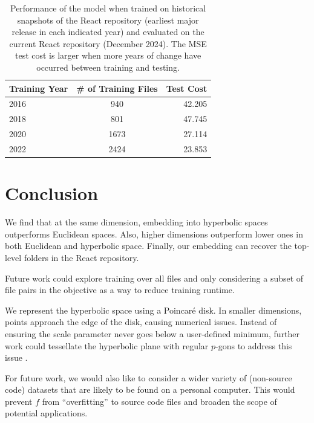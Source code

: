 \documentclass{article}
\begin{document}
\begin{table}[H]
  \centering
  \begin{tabular}{lcr}
    \toprule
    \textbf{Training Year}
         & \textbf{\# of Training Files}
         & \textbf{Test Cost}                     \\
    \midrule
    2016 & 940                           & 42.205 \\
    2018 & 801                           & 47.745 \\
    2020 & 1673                          & 27.114 \\
    2022 & 2424                          & 23.853 \\
    \bottomrule
  \end{tabular}
  \caption{Performance of the model when trained on historical snapshots of the React repository (earliest major release in each indicated year) and evaluated on the current React repository (December 2024). The MSE test cost is larger when more years of change have occurred between training and testing.}
  \label{tab:historical-transfer}
\end{table}

\section{Conclusion}
We find that at the same dimension, embedding into hyperbolic spaces outperforms Euclidean spaces. Also, higher dimensions outperform lower ones in both Euclidean and hyperbolic space. Finally, our embedding can recover the top-level folders in the React repository.

Future work could explore training over all files and only considering a subset of file pairs in the objective as a way to reduce training runtime.

We represent the hyperbolic space using a Poincaré disk. In smaller dimensions, points approach the edge of the disk, causing numerical issues. Instead of ensuring the scale parameter never goes below a user-defined minimum, further work could tessellate the hyperbolic plane with regular $p$-gons to address this issue \cite{celinska2024numerical}.

For future work, we would also like to consider a wider variety of (non-source code) datasets that are likely to be found on a personal computer. This would prevent $f$ from “overfitting” to source code files and broaden the scope of potential applications.


\printbibliography
\end{document}
